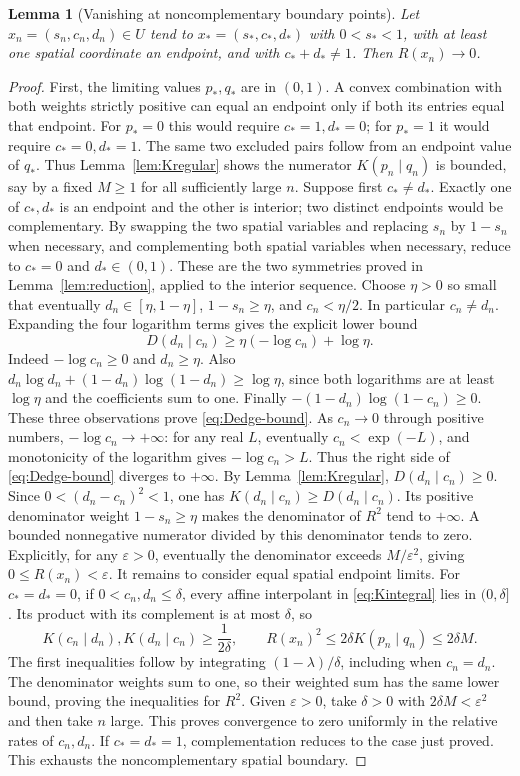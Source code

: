 \documentclass[11pt,a4paper]{article}
\newtheorem{lemma}{Lemma}[section]
\theoremstyle{definition}
\newcommand{\E}[2]{\refstepcounter{equation}\[#2\tag{\theequation}\label{eq:#1}\]}
\begin{document}
\begin{lemma}[Vanishing at noncomplementary boundary points]\label{lem:vanishing}
Let $x_n=(s_n,c_n,d_n)\in U$ tend to $x_*=(s_*,c_*,d_*)$ with $0<s_*<1$, with at least one spatial coordinate an endpoint, and with $c_*+d_*\ne1$. Then $R(x_n)\to0$.
\end{lemma}
\begin{proof}
First, the limiting values $p_*,q_*$ are in $(0,1)$. A convex combination with both weights strictly positive can equal an endpoint only if both its entries equal that endpoint. For $p_*=0$ this would require $c_*=1,d_*=0$; for $p_*=1$ it would require $c_*=0,d_*=1$. The same two excluded pairs follow from an endpoint value of $q_*$. Thus Lemma~\ref{lem:Kregular} shows the numerator $K(p_n\mid q_n)$ is bounded, say by a fixed $M\geq1$ for all sufficiently large $n$.
Suppose first $c_*\ne d_*$. Exactly one of $c_*,d_*$ is an endpoint and the other is interior; two distinct endpoints would be complementary. By swapping the two spatial variables and replacing $s_n$ by $1-s_n$ when necessary, and complementing both spatial variables when necessary, reduce to $c_*=0$ and $d_*\in(0,1)$. These are the two symmetries proved in Lemma~\ref{lem:reduction}, applied to the interior sequence.
Choose $\eta>0$ so small that eventually $d_n\in[\eta,1-\eta]$, $1-s_n\geq\eta$, and $c_n<\eta/2$. In particular $c_n\ne d_n$.
Expanding the four logarithm terms gives the explicit lower bound
\E{Dedge-bound}{D(d_n\mid c_n)\geq\eta(-\log c_n)+\log\eta.}
Indeed $-\log c_n\geq0$ and $d_n\geq\eta$. Also
$d_n\log d_n+(1-d_n)\log(1-d_n)\geq\log\eta$, since both logarithms are at least $\log\eta$ and the coefficients sum to one. Finally $-(1-d_n)\log(1-c_n)\geq0$. These three observations prove \eqref{eq:Dedge-bound}.
As $c_n\to0$ through positive numbers, $-\log c_n\to+\infty$: for any real $L$, eventually $c_n<\exp(-L)$, and monotonicity of the logarithm gives $-\log c_n>L$. Thus the right side of \eqref{eq:Dedge-bound} diverges to $+\infty$.
By Lemma~\ref{lem:Kregular}, $D(d_n\mid c_n)\geq0$. Since $0<(d_n-c_n)^2<1$, one has $K(d_n\mid c_n)\geq D(d_n\mid c_n)$. Its positive denominator weight $1-s_n\geq\eta$ makes the denominator of $R^2$ tend to $+\infty$. A bounded nonnegative numerator divided by this denominator tends to zero. Explicitly, for any $\varepsilon>0$, eventually the denominator exceeds $M/\varepsilon^2$, giving $0\leq R(x_n)<\varepsilon$.
It remains to consider equal spatial endpoint limits. For $c_*=d_*=0$, if $0<c_n,d_n\leq\delta$, every affine interpolant in \eqref{eq:Kintegral} lies in $(0,\delta]$. Its product with its complement is at most $\delta$, so
\E{corner-bound}{K(c_n\mid d_n),K(d_n\mid c_n)\geq\frac1{2\delta},\qquad
 R(x_n)^2\leq2\delta K(p_n\mid q_n)\leq2\delta M.}
The first inequalities follow by integrating $(1-\lambda)/\delta$, including when $c_n=d_n$. The denominator weights sum to one, so their weighted sum has the same lower bound, proving the inequalities for $R^2$. Given $\varepsilon>0$, take $\delta>0$ with $2\delta M<\varepsilon^2$ and then take $n$ large. This proves convergence to zero uniformly in the relative rates of $c_n,d_n$. If $c_*=d_*=1$, complementation reduces to the case just proved. This exhausts the noncomplementary spatial boundary.
\end{proof}
\end{document}
